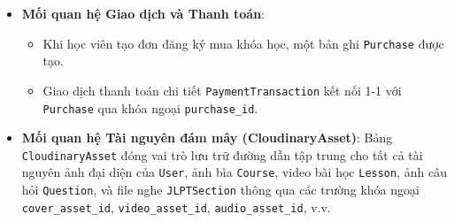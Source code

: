 \documentclass[../DoAn.tex]{subfiles}
\begin{document}
\begin{itemize}
\begin{itemize}
        \end{itemize}
    \item \textbf{Mối quan hệ Giao dịch và Thanh toán}:
        \begin{itemize}
            \item Khi học viên tạo đơn đăng ký mua khóa học, một bản ghi \texttt{Purchase} được tạo.
            \item Giao dịch thanh toán chi tiết \texttt{PaymentTransaction} kết nối 1-1 với \texttt{Purchase} qua khóa ngoại \texttt{purchase\_id}.
        \end{itemize}
    \item \textbf{Mối quan hệ Tài nguyên đám mây (CloudinaryAsset)}: Bảng \texttt{CloudinaryAsset} đóng vai trò lưu trữ đường dẫn tập trung cho tất cả tài nguyên ảnh đại diện của \texttt{User}, ảnh bìa \texttt{Course}, video bài học \texttt{Lesson}, ảnh câu hỏi \texttt{Question}, và file nghe \texttt{JLPTSection} thông qua các trường khóa ngoại \texttt{cover\_asset\_id}, \texttt{video\_asset\_id}, \texttt{audio\_asset\_id}, v.v.
\end{itemize}
\end{document}
